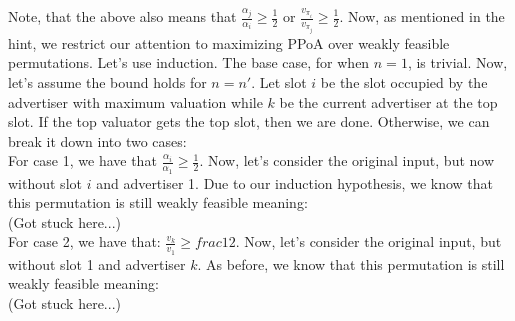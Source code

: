 \documentclass[12 pt]{article}
\begin{document}
	\noindent Note, that the above also means that $\frac{\alpha_j}{\alpha_i} \geq \frac{1}{2}$ or $\frac{v_{\pi_i}}{v_{\pi_j}} \geq \frac{1}{2}$. Now, as mentioned in the hint, we restrict our attention to maximizing PPoA over weakly feasible permutations. Let's use induction. The base case, for when $n = 1$, is trivial. Now, let's assume the bound holds for $n = n'$. Let slot $i$ be the slot occupied by the advertiser with maximum valuation while $k$ be the current advertiser at the top slot. If the top valuator gets the top slot, then we are done. Otherwise, we can break it down into two cases:\\
	
	\noindent For case 1, we have that $\frac{\alpha_i}{\alpha_1} \geq \frac{1}{2}$. Now, let's consider the original input, but now without slot $i$ and advertiser 1. Due to our induction hypothesis, we know that this permutation is still weakly feasible meaning:\\
	
	\noindent (Got stuck here...)\\
	
	\noindent For case 2, we have that: $\frac{v_k}{v_1} \geq {frac}{1}{2}.$ Now, let's consider the original input, but without slot 1 and advertiser $k$. As before, we know that this permutation is still weakly feasible meaning:\\
	
	\noindent (Got stuck here...)\\
		
\end{document}
